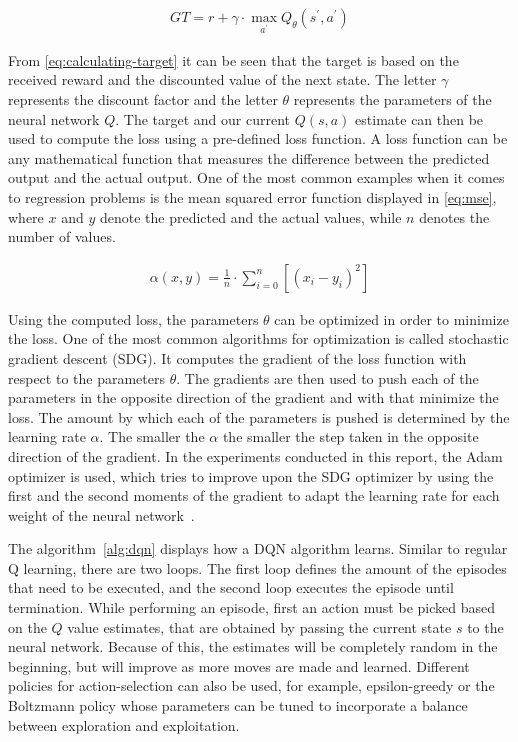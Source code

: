 \documentclass{article}
\begin{document}
\begin{align}
   \label{eq:calculating-target}
    GT = r + \gamma \cdot \max_{a^\prime} Q_{\theta}(s^\prime, a^\prime)
\end{align}

From \autoref{eq:calculating-target} it can be seen that the target is based on the received reward and the discounted
value of the next state.
The letter $\gamma$ represents the discount factor and the letter $\theta$ represents the parameters of the neural network $Q$.
The target and our current $Q(s,a)$ estimate can then be used to compute the loss using a pre-defined loss function.
A loss function can be any mathematical function that measures the difference between the predicted output and the
actual output.
One of the most common examples when it comes to regression problems is the mean squared error function displayed
in \autoref{eq:mse}, 
where $x$ and $y$ denote the predicted and the actual values, while $n$ denotes the number of values.

\begin{align}
   \label{eq:mse}
   \alpha(x, y) = \frac{1}{n} \cdot \sum_{i = 0}^{n} [(x_i - y_i)^2]
\end{align}

Using the computed loss, the parameters $\theta$ can be optimized in order to minimize the loss.
One of the most common algorithms for optimization is called stochastic gradient descent (SDG).
It computes the gradient of the loss function with respect to the parameters $\theta$.
The gradients are then used to push each of the parameters in the opposite direction of the gradient and with that minimize
the loss.
The amount by which each of the parameters is pushed is determined by the learning rate $\alpha$.
The smaller the $\alpha$ the smaller the step taken in the opposite direction of the gradient.
In the experiments conducted in this report, the Adam optimizer is used, which tries to improve upon the SDG optimizer
by using the first and the second moments of the gradient to adapt the learning rate for each weight
of the neural network~\cite{DBLP:journals/corr/KingmaB14}.

The algorithm~\ref{alg:dqn} displays how a DQN algorithm learns.
Similar to regular Q learning, there are two loops.
The first loop defines the amount of the episodes that need to be executed, and the second loop executes
the episode until termination.
While performing an episode, first an action must be picked based on the $Q$ value estimates,
that are obtained by passing the current state $s$ to the neural network.
Because of this, the estimates will be completely random in the beginning, but will improve as more moves are made and learned.
Different policies for action-selection can also be used, for example, epsilon-greedy or the Boltzmann policy
whose parameters can be tuned to incorporate a balance between exploration and exploitation.
\end{document}
